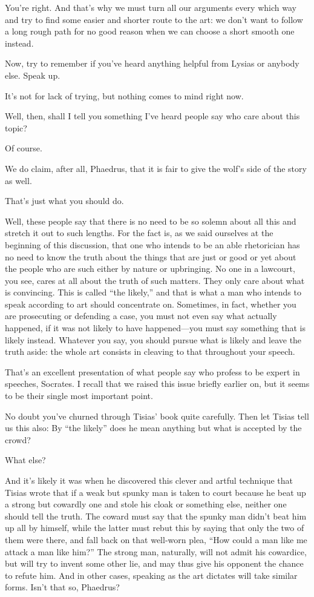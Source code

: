 \saysocrates You're right. And that's why we must turn all our arguments
every which way and try to find some easier and shorter route to the
art: we don't want to follow a long rough path for no good
reason when we can choose a short smooth one instead.

Now, try to remember if you've heard anything helpful from Lysias or
anybody else. Speak up.

\sayphaedrus It's not for lack of trying, but nothing comes to mind right
now.

\saysocrates Well, then, shall I tell you something I've heard people say
who care about this topic?

\sayphaedrus Of course.

\saysocrates We do claim, after all, Phaedrus, that it is fair to give the
wolf's side of the story as well.

\sayphaedrus That's just what you should do.

\saysocrates Well, these people say that there is no need to be so solemn
about all this and stretch it out to such lengths. For the fact is, as
we said ourselves at the beginning of this
discussion, that one
who intends to be an able rhetorician has no need to know the truth
about the things that are just or good or yet about the people who are
such either by nature or upbringing. No one in a lawcourt, you see,
cares at all about the truth of such matters. They only care about what
is convincing. This is called “the likely,” and that is what a
man who intends to speak according to art should concentrate on.
Sometimes, in fact, whether you are prosecuting or defending a case, you
must not even say what actually happened, if it was not likely to have
happened---you must say something that is likely instead. Whatever you
say, you should pursue what is likely and leave the truth aside: the
whole art consists in cleaving to that throughout your
speech.

\sayphaedrus That's an excellent presentation of what people say who
profess to be expert in speeches, Socrates. I recall that we raised this
issue briefly earlier on, but it seems to be their single most important
point.

\saysocrates No doubt you've churned through Tisias' book quite carefully.
Then let Tisias tell us this also: By “the likely” does he mean anything
but what is accepted by the crowd?

\sayphaedrus What else?

\saysocrates And it's likely it was when he discovered this clever and
artful technique that Tisias wrote that if a weak but spunky man is
taken to court because he beat up a strong but cowardly one and stole
his cloak or something else, neither one should tell the truth. The
coward must say that the spunky man didn't beat him up all by himself,
while the latter must rebut this by saying that only the two of
them were there, and fall back on that well-worn plea, “How could a man
like me attack a man like him?” The strong man, naturally, will not
admit his cowardice, but will try to invent some other lie, and may thus
give his opponent the chance to refute him. And in other cases, speaking
as the art dictates will take similar forms. Isn't that so, Phaedrus?

